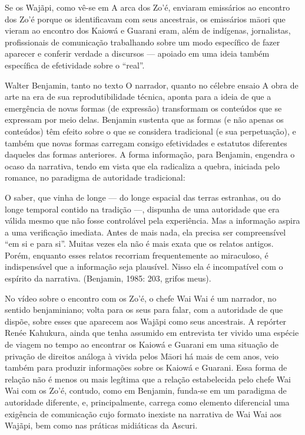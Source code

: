 Se os Wajãpi, como vê-se em A arca dos Zo’é, enviaram emissários ao
encontro dos Zo’é porque os identificavam com seus ancestrais, os
emissários m\=aori que vieram ao encontro dos Kaiowá e Guarani eram,
além de indígenas, jornalistas, profissionais de comunicação
trabalhando sobre um modo específico de fazer aparecer e conferir
verdade a discursos — apoiado em uma ideia também específica de
efetividade sobre o ``real''.

Walter Benjamin, tanto no texto O narrador, quanto no célebre ensaio A
obra de arte na era de sua reprodutibilidade técnica, aponta para a
ideia de que a emergência de novas formas (de expressão) transformam os
conteúdos que se expressam por meio delas. Benjamin sustenta que as
formas (e não apenas os conteúdos) têm efeito sobre o que se considera
tradicional (e sua perpetuação), e também que novas formas carregam
consigo efetividades e estatutos diferentes daqueles das formas
anteriores. A forma informação, para Benjamin, engendra o ocaso da
narrativa, tendo em vista que ela radicaliza a quebra, iniciada pelo
romance, no paradigma de autoridade tradicional:

O saber, que vinha de longe — do longe espacial das terras estranhas, ou
do longe temporal contido na tradição —, dispunha de uma autoridade que
era válida mesmo que não fosse controlável pela experiência. Mas a
informação aspira a uma verificação imediata. Antes de mais nada, ela
precisa ser compreensível ``em si e para si''. Muitas vezes ela não é
mais exata que os relatos antigos. Porém, enquanto esses relatos
recorriam frequentemente ao miraculoso, é indispensável que a
informação seja plausível. Nisso ela é incompatível com o espírito da
narrativa. (Benjamin, 1985: 203, grifos meus).

No vídeo sobre o encontro com os Zo’é, o chefe Wai Wai é um narrador, no
sentido benjaminiano; volta para os seus para falar, com a autoridade de que dispõe, sobre esses que aparecem aos Wajãpi como seus
ancestrais. A repórter Renée Kahukura, ainda que tenha assumido em
entrevista ter vivido uma espécie de viagem no tempo ao encontrar os
Kaiowá e Guarani em uma situação de privação de direitos análoga à
vivida pelos M\=aori há mais de cem anos, veio também para produzir
informações sobre os Kaiowá e Guarani. Essa forma de relação não é
menos ou mais legítima que a relação estabelecida pelo chefe Wai Wai
com os Zo’é, contudo, como em Benjamin, funda-se em um paradigma de
autoridade diferente, e, principalmente, carrega como elemento
diferencial uma exigência de comunicação cujo formato inexiste na
narrativa de Wai Wai aos Wajãpi, bem como nas práticas midiáticas da
Ascuri.

